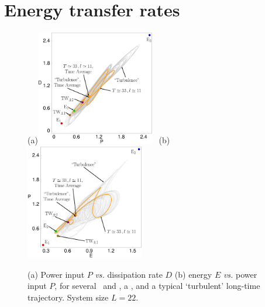 \section{Energy transfer rates} %
\label{sec:energyL22}

\begin{figure}[t]
\begin{center}
(a)\!\!\!\!\includegraphics[width=0.46\textwidth]{figs/energyBalance_pst.eps}%
~(b)\!\!\!\!\includegraphics[width=0.46\textwidth]{figs/equivaEP_pst.eps}
\end{center}
\caption{
(a) Power input $P$ {\em vs.}
dissipation rate $D$
(b) energy $E$  {\em vs.}
power input $P$,   for several  \eqva\ and \reqva,
a \rpo , and a typical `turbulent' long-time trajectory.
System size $L=22$.
        }
\label{f:drivedrag}
\end{figure}

